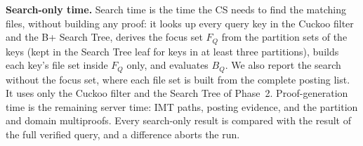 



\textbf{Search-only time.} Search time is the time the CS needs to find the matching files, without
building any proof: it looks up every query key in the Cuckoo filter and the B+ Search Tree, derives
the focus set $F_Q$ from the partition sets of the keys (kept in the Search Tree leaf for keys in at
least three partitions), builds each
key's file set inside $F_Q$ only, and evaluates $B_Q$. We also report the search without the focus set,
where each file set is built from the complete posting list. It uses only the Cuckoo filter and the
Search Tree of Phase~2. Proof-generation time is the
remaining server time: IMT paths, posting evidence, and the partition and domain multiproofs. Every
search-only result is compared with the result of the full verified query, and a difference aborts the
run.

